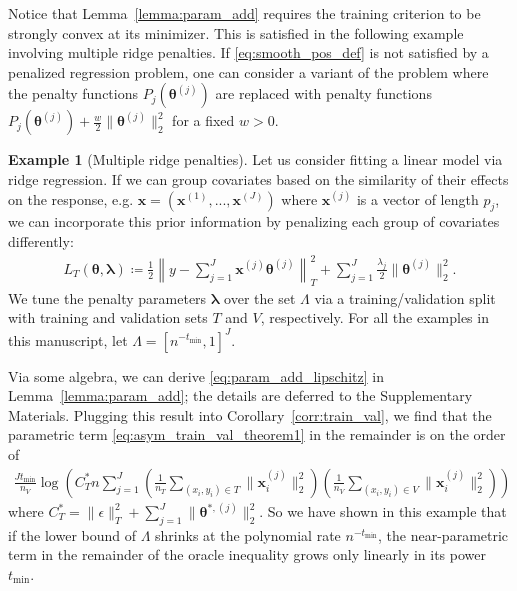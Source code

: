 \documentclass[12pt]{article} %
\theoremstyle{definition}
\newtheorem{example}{Example}
\begin{document}
\noindent Notice that Lemma~\ref{lemma:param_add} requires the training criterion to be strongly convex at its minimizer.
This is satisfied in the following example involving multiple ridge penalties.
If \eqref{eq:smooth_pos_def} is not satisfied by a penalized regression problem, one can consider a variant of the problem where the penalty functions $P_j(\boldsymbol{\theta}^{(j)})$ are replaced with penalty functions
$P_j(\boldsymbol{\theta}^{(j)}) + \frac{w}{2}\| \boldsymbol{\theta}^{(j)} \|_2^2$ for a fixed $w > 0$.
\begin{example}[Multiple ridge penalties]
	\label{ex:ridge}
	Let us consider fitting a linear model via ridge regression.
	If we can group covariates based on the similarity of their effects on the response, e.g. $\boldsymbol{x} = (\boldsymbol{x}^{(1)}, ... , \boldsymbol{x}^{(J)})$ where $\boldsymbol{x}^{(j)}$ is a vector of length $p_j$, we can incorporate this prior information by penalizing each group of covariates differently:
	\begin{align}
	L_T \left (\boldsymbol{\theta}, \boldsymbol{\lambda} \right) 
	\coloneqq 
	\frac{1}{2}
	\left\|
	y -  \sum_{j=1}^J \boldsymbol{x}^{(j)} \boldsymbol{\theta}^{(j)}
	\right \|^2_T
	+ \sum_{j=1}^J \frac{\lambda_j}{2} \|\boldsymbol{\theta}^{(j)}\|_2^2.
	\end{align}
	We tune the penalty parameters $\boldsymbol{\lambda}$ over the set $\Lambda$ via a training/validation split with training and validation sets $T$ and $V$, respectively.
	For all the examples in this manuscript, let $\Lambda = \left [n^{- t_{\min}}, 1 \right ]^J$.

	Via some algebra, we can derive \eqref{eq:param_add_lipschitz} in Lemma~\ref{lemma:param_add}; the details are deferred to the Supplementary Materials.
	Plugging this result into Corollary~\ref{corr:train_val}, we find that the parametric term \eqref{eq:asym_train_val_theorem1} in the remainder is on the order of
	\begin{align}
	\frac{J t_{\min}}{n_{V}}
	\log \left (
	C^*_T n
	\sum_{j = 1}^J
	\left(\frac{1}{n_T} \sum_{(x_i, y_i) \in T} \|\boldsymbol{x}_i^{(j)}\|^2_2\right)
	\left(\frac{1}{n_V} \sum_{(x_i, y_i) \in V} \|\boldsymbol{x}_i^{(j)}\|^2_2\right)
	\right )
	\end{align}
	where $
	C^*_{T} =
	\|\epsilon\|_{T}^{2}
	+ \sum_{j=1}^J \|\boldsymbol{\theta}^{*,(j)}\|_2^2
	.$
	So we have shown in this example that if the lower bound of $\Lambda$ shrinks at the polynomial rate $n^{-t_{\min}}$, the near-parametric term in the remainder of the oracle inequality grows only linearly in its power $t_{\min}$.
\end{example}
\end{document}

